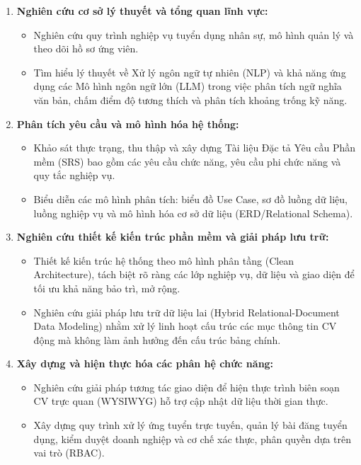 \begin{enumerate}
    \item \textbf{Nghiên cứu cơ sở lý thuyết và tổng quan lĩnh vực:}
    \begin{itemize}
        \item Nghiên cứu quy trình nghiệp vụ tuyển dụng nhân sự, mô hình quản lý và theo dõi hồ sơ ứng viên.
        \item Tìm hiểu lý thuyết về Xử lý ngôn ngữ tự nhiên (NLP) và khả năng ứng dụng các Mô hình ngôn ngữ lớn (LLM) trong việc phân tích ngữ nghĩa văn bản, chấm điểm độ tương thích và phân tích khoảng trống kỹ năng.
    \end{itemize}

    \item \textbf{Phân tích yêu cầu và mô hình hóa hệ thống:}
    \begin{itemize}
        \item Khảo sát thực trạng, thu thập và xây dựng Tài liệu Đặc tả Yêu cầu Phần mềm (SRS) bao gồm các yêu cầu chức năng, yêu cầu phi chức năng và quy tắc nghiệp vụ.
        \item Biểu diễn các mô hình phân tích: biểu đồ Use Case, sơ đồ luồng dữ liệu, luồng nghiệp vụ và mô hình hóa cơ sở dữ liệu (ERD/Relational Schema).
    \end{itemize}

    \item \textbf{Nghiên cứu thiết kế kiến trúc phần mềm và giải pháp lưu trữ:}
    \begin{itemize}
        \item Thiết kế kiến trúc hệ thống theo mô hình phân tầng (Clean Architecture), tách biệt rõ ràng các lớp nghiệp vụ, dữ liệu và giao diện để tối ưu khả năng bảo trì, mở rộng.
        \item Nghiên cứu giải pháp lưu trữ dữ liệu lai (Hybrid Relational-Document Data Modeling) nhằm xử lý linh hoạt cấu trúc các mục thông tin CV động mà không làm ảnh hưởng đến cấu trúc bảng chính.
    \end{itemize}

    \item \textbf{Xây dựng và hiện thực hóa các phân hệ chức năng:}
    \begin{itemize}
        \item Nghiên cứu giải pháp tương tác giao diện để hiện thực trình biên soạn CV trực quan (WYSIWYG) hỗ trợ cập nhật dữ liệu thời gian thực.
        \item Xây dựng quy trình xử lý ứng tuyển trực tuyến, quản lý bài đăng tuyển dụng, kiểm duyệt doanh nghiệp và cơ chế xác thực, phân quyền dựa trên vai trò (RBAC).
    \end{itemize}


\end{enumerate}
